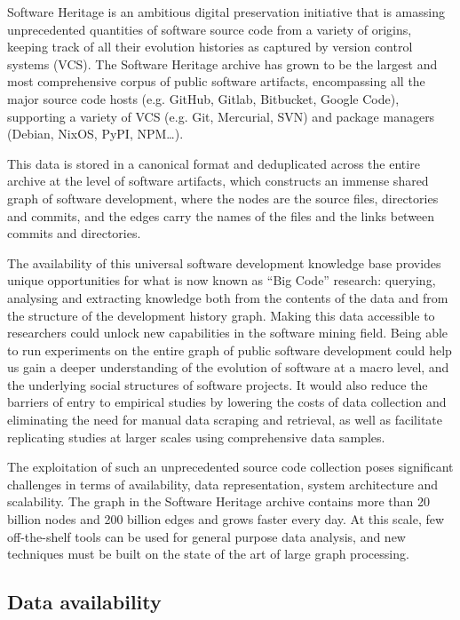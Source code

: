 Software Heritage is an ambitious digital preservation initiative that is
amassing unprecedented quantities of software source code from a variety of
origins, keeping track of all their evolution histories as captured by version
control systems (VCS). The Software Heritage archive has grown to be the
largest and most comprehensive corpus of public software artifacts,
encompassing all the major source code hosts (e.g. GitHub, Gitlab, Bitbucket,
Google Code), supporting a variety of VCS (e.g. Git, Mercurial, SVN) and
package managers (Debian, NixOS, PyPI, NPM…).

This data is stored in a canonical format and deduplicated across the entire
archive at the level of software artifacts, which constructs an immense shared
graph of software development, where the nodes are the source files,
directories and commits, and the edges carry the names of the files and the
links between commits and directories.

The availability of this universal software development knowledge base provides
unique opportunities for what is now known as “Big Code” research: querying,
analysing and extracting knowledge both from the contents of the data and from
the structure of the development history graph. Making this data accessible to
researchers could unlock new capabilities in the software mining field. Being
able to run experiments on the entire graph of public software development
could help us gain a deeper understanding of the evolution of software at a
macro level, and the underlying social structures of software projects. It
would also reduce the barriers of entry to empirical studies by lowering the
costs of data collection and eliminating the need for manual data scraping and
retrieval, as well as facilitate replicating studies at larger scales using
comprehensive data samples.

The exploitation of such an unprecedented source code collection poses
significant challenges in terms of availability, data representation, system
architecture and scalability. The graph in the Software Heritage archive
contains more than 20 billion nodes and 200 billion edges and grows faster
every day. At this scale, few off-the-shelf tools can be used for general
purpose data analysis, and new techniques must be built on the state of the art
of large graph processing.

\subsection*{Data availability}


